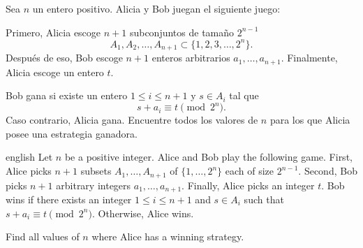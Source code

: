 \begin{problem}[Nordic 2021/3]
  Sea $n$ un entero positivo. Alicia y Bob juegan el siguiente juego:
  \begin{itemize}
    \ii Primero, Alicia escoge $n+1$ subconjuntos de tamaño $2^{n-1}$
    \[A_1,A_2,\dots,A_{n+1}\subset\{1,2,3,\dots,2^n\}.\]
    \ii Después de eso, Bob escoge $n+1$ enteros arbitrarios
    $a_1,\dots,a_{n+1}$.
    \ii Finalmente, Alicia escoge un entero $t$.
  \end{itemize}
  Bob gana si existe un entero $1\le i\le n+1$ y $s\in A_i$ tal que
  \[s+a_i\equiv t\pmod{2^n}.\]
  Caso contrario, Alicia gana. Encuentre todos los valores de $n$ para los que
  Alicia posee una estrategia ganadora.
  \begin{hint}
    \begin{otherlanguage*}{english}
      Let $n$ be a positive integer. Alice and Bob play the following game.
      First, Alice picks $n+1$ subsets $A_1,\dots,A_{n+1}$ of $\{1,\dots,2^n\}$
      each of size $2^{n-1}$. Second, Bob picks $n+1$ arbitrary integers
      $a_1,\dots,a_{n+1}$. Finally, Alice picks an integer $t$. Bob wins if
      there exists an integer $1\le i\le n+1$ and $s\in A_i$ such that
      $s+a_i\equiv t\pmod{2^n}$. Otherwise, Alice wins.

      Find all values of $n$ where Alice has a winning strategy.
    \end{otherlanguage*}
  \end{hint}
\end{problem}
